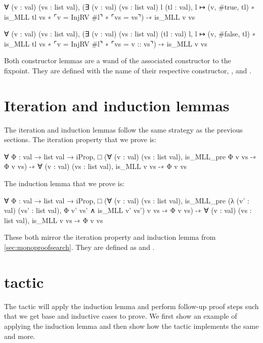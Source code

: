 \documentclass[thesis.tex]{subfiles}
\begin{document}
{\begin{coqcode}
  ∀ (v : val) (vs : list val),
    (∃ (v : val) (vs : list val) l (tl : val), 
          l ↦ (v, #true, tl) ∗ is_MLL tl vs ∗ 
          ⌜v = InjRV #l⌝ ∗ ⌜vs = vs⌝) 
       -∗ is_MLL v vs

  ∀ (v : val) (vs : list val),
    (∃ (v : val) (vs : list val) (tl : val) l, 
          l ↦ (v, #false, tl) ∗ is_MLL tl vs ∗ 
          ⌜v = InjRV #l⌝ ∗ ⌜vs = v :: vs⌝) 
       -∗ is_MLL v vs
\end{coqcode}
Both constructor lemmas are a wand of the associated constructor to the fixpoint. They are defined with the name of their respective constructor, ,  and .

\section{Iteration and induction lemmas}\label{sec:constriterind}
The iteration and induction lemmas follow the same strategy as the previous sections. The iteration property that we prove is:
\begin{coqcode}
  ∀ Φ : val → list val → iProp,
       □ (∀ (v : val) (vs : list val), 
            is_MLL_pre Φ v vs -∗ Φ v vs) 
    -∗ ∀ (v : val) (vs : list val), is_MLL v vs -∗ Φ v vs
\end{coqcode}
The induction lemma that we prove is:
\begin{coqcode}
  ∀ Φ : val → list val → iProp,
       □ (∀ (v : val) (vs : list val), 
               is_MLL_pre 
                  (λ (v' : val) (vs' : list val), 
                    Φ v' vs' ∧ is_MLL v' vs') 
                  v vs 
            -∗ Φ v vs) 
    -∗ ∀ (v : val) (vs : list val), is_MLL v vs -∗ Φ v vs
\end{coqcode}
These both mirror the iteration property and induction lemma from \cref{sec:monoproofsearch}. They are defined as  and .

\section{ tactic}\label{sec:inductiontactic}
The  tactic will apply the induction lemma and perform follow-up proof steps such that we get base and inductive cases to prove. We first show an example of applying the induction lemma and then show how the  tactic implements the same and more.

}
\end{document}
